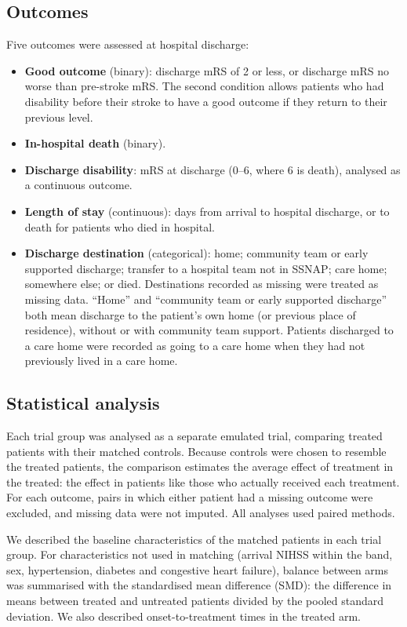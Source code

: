 \subsection*{Outcomes}

Five outcomes were assessed at hospital discharge:
\begin{itemize}
    \item \textbf{Good outcome} (binary): discharge mRS of 2 or less, or discharge mRS no worse than pre-stroke mRS. The second condition allows patients who had disability before their stroke to have a good outcome if they return to their previous level.
    \item \textbf{In-hospital death} (binary).
    \item \textbf{Discharge disability}: mRS at discharge (0--6, where 6 is death), analysed as a continuous outcome.
    \item \textbf{Length of stay} (continuous): days from arrival to hospital discharge, or to death for patients who died in hospital.
    \item \textbf{Discharge destination} (categorical): home; community team or early supported discharge; transfer to a hospital team not in SSNAP; care home; somewhere else; or died. Destinations recorded as missing were treated as missing data. ``Home'' and ``community team or early supported discharge'' both mean discharge to the patient's own home (or previous place of residence), without or with community team support. Patients discharged to a care home were recorded as going to a care home when they had not previously lived in a care home.
\end{itemize}

\subsection*{Statistical analysis}

Each trial group was analysed as a separate emulated trial, comparing treated patients with their matched controls. Because controls were chosen to resemble the treated patients, the comparison estimates the average effect of treatment in the treated: the effect in patients like those who actually received each treatment. For each outcome, pairs in which either patient had a missing outcome were excluded, and missing data were not imputed. All analyses used paired methods.

We described the baseline characteristics of the matched patients in each trial group. For characteristics not used in matching (arrival NIHSS within the band, sex, hypertension, diabetes and congestive heart failure), balance between arms was summarised with the standardised mean difference (SMD): the difference in means between treated and untreated patients divided by the pooled standard deviation. We also described onset-to-treatment times in the treated arm.

